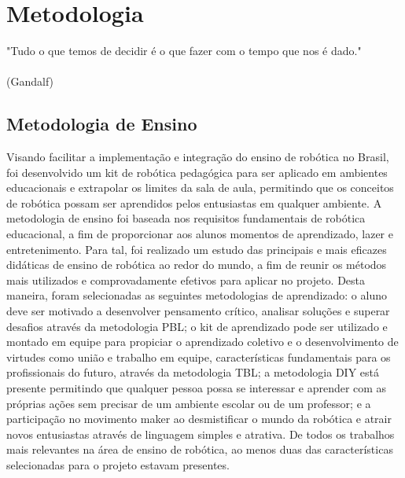 \chapter{Metodologia}
\label{chap:meto}
\begin{flushright}
	"Tudo o que temos de decidir é o que fazer com o tempo que nos é dado." \\
	\ \\
	(Gandalf)
\end{flushright}

\section{Metodologia de Ensino}\label{sec:metod_ensino}
Visando facilitar a implementação e integração do ensino de robótica no Brasil, foi desenvolvido um kit de robótica pedagógica para ser aplicado em ambientes educacionais e extrapolar os limites da sala de aula, permitindo que os conceitos de robótica possam ser aprendidos pelos entusiastas em qualquer ambiente. A metodologia de ensino foi baseada nos requisitos fundamentais de robótica educacional, a fim de proporcionar aos alunos momentos de aprendizado, lazer e entretenimento. Para tal, foi realizado um estudo das principais e mais eficazes didáticas de ensino de robótica ao redor do mundo, a fim de reunir os métodos mais utilizados e comprovadamente efetivos para aplicar no projeto. Desta maneira, foram selecionadas as seguintes metodologias de aprendizado: o aluno deve ser motivado a desenvolver pensamento crítico, analisar soluções e superar desafios através da metodologia PBL; o kit de aprendizado pode ser utilizado e montado em equipe para propiciar o aprendizado coletivo e o desenvolvimento de virtudes como união e trabalho em equipe, características fundamentais para os profissionais do futuro, através da metodologia TBL; a metodologia DIY está presente permitindo que qualquer pessoa possa se interessar e aprender com as próprias ações sem precisar de um ambiente escolar ou de um professor; e a participação no movimento maker ao desmistificar o mundo da robótica e atrair novos entusiastas através de linguagem simples e atrativa. De todos os trabalhos mais relevantes na área de ensino de robótica, ao menos duas das características selecionadas para o projeto estavam presentes.
	